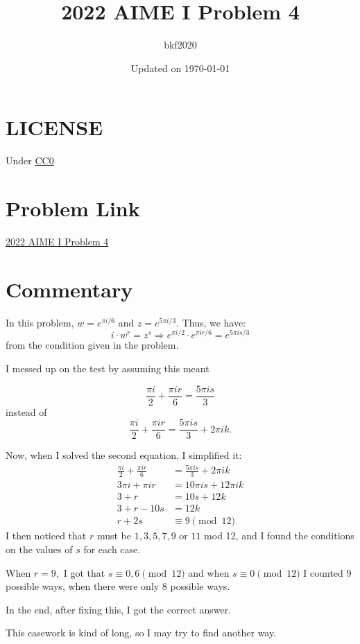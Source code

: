 \documentclass{article}
\title{2022 AIME I Problem 4}
\author{bkf2020}
\date{Updated on \today}
\begin{document}
\maketitle

\section*{LICENSE}
Under \href{https://creativecommons.org/publicdomain/zero/1.0/}{CC0}

\section*{Problem Link}
\href{https://artofproblemsolving.com/wiki/index.php/2022\_AIME\_I\_Problems#Problem\_4}{2022 AIME I Problem 4}

\section*{Commentary}
In this problem, $w = e^{\pi i/6}$ and $z = e^{5\pi i/3}$. Thus, we have:
$$i \cdot w^r = z^s \Longrightarrow e^{\pi i/2} \cdot e^{\pi ir/6} = e^{5\pi is/3}$$ from the condition given
in the problem.

I messed up on the test by assuming this meant

$$\frac{\pi i}{2} + \frac{\pi ir}{6} = \frac{5\pi is}{3}$$ instead of 
$$\frac{\pi i}{2} + \frac{\pi ir}{6} = \frac{5\pi is}{3} + 2\pi i k.$$

Now, when I solved the second equation, I simplified it:
\begin{align*}
	\frac{\pi i}{2} + \frac{\pi ir}{6} &= \frac{5\pi is}{3} + 2\pi i k \\
	3\pi i + \pi ir &= 10\pi is + 12\pi ik \\
	3 + r &= 10s + 12 k \\
	3 + r - 10s &= 12k \\
	r + 2s &\equiv 9 \pmod{12}
\end{align*}
I then noticed that $r$ must be $1, 3, 5, 7, 9$ or $11$ mod 12, and I found the conditions on the values of $s$ for each case.

When $r = 9,$ I got that $s \equiv 0, 6\pmod{12}$ and when $s \equiv 0 \pmod{12}$ I counted 9 possible ways, when there were
only 8 possible ways.

In the end, after fixing this, I got the correct answer.

This casework is kind of long, so I may try to find another way.
\end{document}
